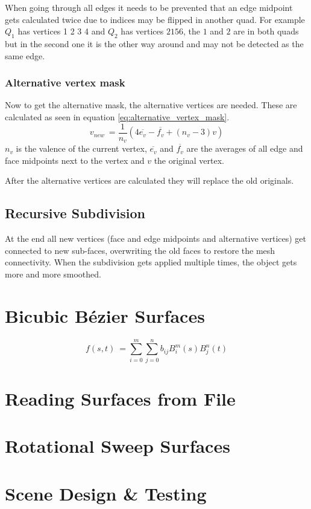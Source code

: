 \documentclass[11.5pt,oneside,a4paper]{scrartcl}
\newcounter{ct}
\begin{document}
When going through all edges it needs to be prevented that an edge midpoint gets calculated twice due to indices may be flipped in another quad. For example $Q_1$ has vertices 1 2 3 4 and $Q_2$ has vertices $2 1 5 6$, the $1$ and $2$ are in both quads but in the second one it is the other way around and may not be detected as the same edge.

\vspace{0.2cm}

\subsubsection{Alternative vertex mask}
Now to get the alternative mask, the alternative vertices are needed. These are calculated as seen in equation \ref{eq:alternative_vertex_mask}.
\begin{equation} \label{eq:alternative_vertex_mask}
        v_{new} \ = \frac{1}{n_{v}} ( 4 \overline{e_{v}} - \overline{f_{v}} + (n_{v}-3) v)
\end{equation} 
$n_{v}$ is the valence of the current vertex, $\overline{e_{v}}$ and $\overline{f_{v}}$ are the averages of all edge and face midpoints next to the vertex and $v$ the original vertex.

After the alternative vertices are calculated they will replace the old originals.

\subsection{Recursive Subdivision}
At the end all new vertices (face and edge midpoints and alternative vertices) get connected to new sub-faces, overwriting the old faces to restore the mesh connectivity. When the subdivision gets applied multiple times, the object gets more and more smoothed.

\section{Bicubic Bézier Surfaces}
\begin{equation} \label{eq:bezier_surface}
        f(s, t) \ = \sum_{i=0}^m \sum_{j=0}^n b_{ij} B_{i}^m(s) B_{j}^n(t)
\end{equation} 
\section{Reading Surfaces from File}
\section{Rotational Sweep Surfaces}
\section{Scene Design \& Testing}
\end{document}
